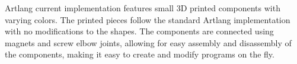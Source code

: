 Artlang current implementation features small 3D printed components with varying colors.
The printed pieces follow the standard Artlang implementation with no modifications to the shapes.
The components are connected using magnets and screw elbow joints, allowing for easy assembly and disassembly of the components, making it easy to create and modify programs on the fly.
\endinput